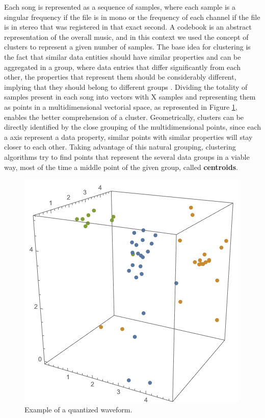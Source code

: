 \documentclass[12pt]{article}
\begin{document}
Each song is represented as a sequence of samples, where each sample is a singular frequency if the file is in mono or the frequency of each channel if the file is in stereo that was registered in that exact second. A codebook is an abstract representation of the overall music, and in this context we used the concept of clusters to represent a given number of samples.  The base idea for clustering is the fact that similar data entities should have similar properties and can be aggregated in a group, where data entries that differ significantly from each other, the properties that represent them should be considerably different, implying that they should belong to different groups \cite{clustering}. Dividing the totality of samples present in each song into vectors with X samples and representing them as points in a multidimensional vectorial space, as represented in Figure \ref{fig:pointsEx}, enables the better comprehension of a cluster. Geometrically, clusters can be directly identified by the close grouping of the multidimensional points, since each a axis represent a data property, similar points with similar properties will stay closer to each other. Taking advantage of this natural grouping, clustering algorithms try to find points that represent the several data groups in a viable way, most of the time a middle point of the given group, called \textbf{centroids}.

\begin{figure}[H]
  \centering
  \begin{minipage}{\textwidth}
    \centering
    \includegraphics[width=0.5\linewidth]{pointsEx.png}
  \end{minipage}%
  \caption{Example of a quantized waveform.}
  \label{fig:pointsEx}
\end{figure}
\end{document}
